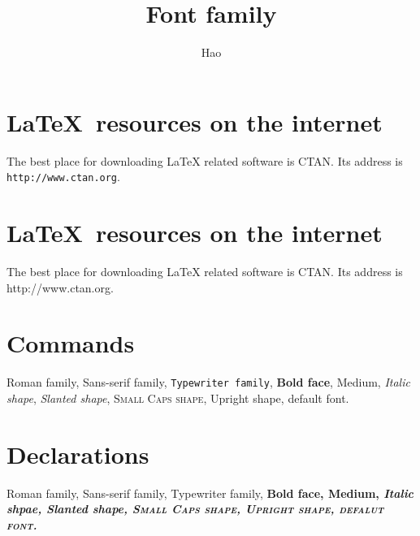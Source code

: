 \documentclass[a4paper,10pt]{article}
\title{Font family}
\author{Hao}
\begin{document}
\maketitle
\section{\textsf{\LaTeX\ resources on the internet}}
The best place for downloading LaTeX related software is CTAN.
Its address is \texttt{http://www.ctan.org}.

\section{\sffamily\LaTeX\ resources on the internet}
The best place for downloading LaTeX related software is CTAN.
Its address is \ttfamily http://www.ctan.org.

\section{Commands}
\textrm{Roman family},
\textsf{Sans-serif family},
\texttt{Typewriter family},
\textbf{Bold face},
\textmd{Medium},
\textit{Italic shape},
\textsl{Slanted shape},
\textsc{Small Caps shape},
\textup{Upright shape},
\textnormal{default font}.

\section{Declarations}
\rmfamily Roman family,
\sffamily Sans-serif family,
\ttfamily Typewriter family,
\bfseries Bold face,
\mdseries Medium,
\itshape Italic shpae,
\slshape Slanted shape,
\scshape Small Caps shape,
\upshape Upright shape,
\normalfont defalut font.
\end{document}
